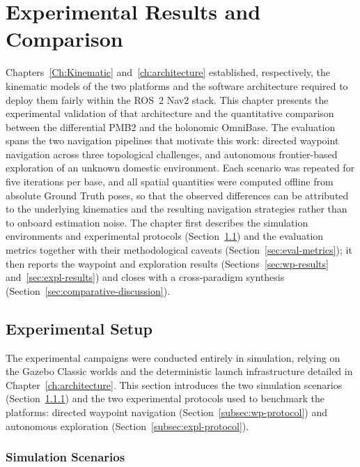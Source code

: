 
\chapter{Experimental Results and Comparison}
\label{ch:results}

Chapters~\ref{Ch:Kinematic} and~\ref{ch:architecture} established, respectively, the kinematic models of the two platforms and the software architecture required to deploy them fairly within the ROS~2 Nav2 stack. This chapter presents the experimental validation of that architecture and the quantitative comparison between the differential PMB2 and the holonomic OmniBase. The evaluation spans the two navigation pipelines that motivate this work: directed waypoint navigation across three topological challenges, and autonomous frontier-based exploration of an unknown domestic environment. Each scenario was repeated for five iterations per base, and all spatial quantities were computed offline from absolute Ground Truth poses, so that the observed differences can be attributed to the underlying kinematics and the resulting navigation strategies rather than to onboard estimation noise. The chapter first describes the simulation environments and experimental protocols (Section~\ref{sec:exp-setup}) and the evaluation metrics together with their methodological caveats (Section~\ref{sec:eval-metrics}); it then reports the waypoint and exploration results (Sections~\ref{sec:wp-results} and~\ref{sec:expl-results}) and closes with a cross-paradigm synthesis (Section~\ref{sec:comparative-discussion}).

\section{Experimental Setup}
\label{sec:exp-setup}

The experimental campaigns were conducted entirely in simulation, relying on the Gazebo Classic worlds and the deterministic launch infrastructure detailed in Chapter~\ref{ch:architecture}. This section introduces the two simulation scenarios (Section~\ref{subsec:sim-scenarios}) and the two experimental protocols used to benchmark the platforms: directed waypoint navigation (Section~\ref{subsec:wp-protocol}) and autonomous exploration (Section~\ref{subsec:expl-protocol}).

\subsection{Simulation Scenarios}
\label{subsec:sim-scenarios}

